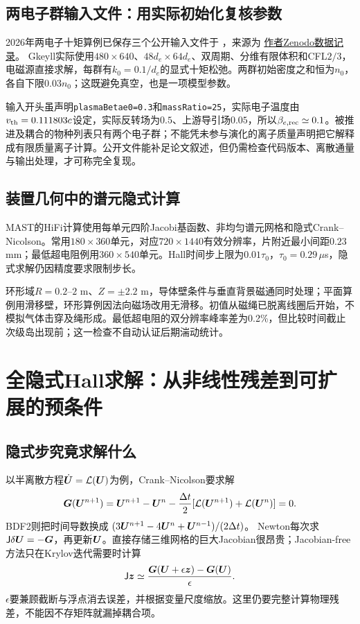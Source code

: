 \subsection{两电子群输入文件：用实际初始化复核参数}
2026年两电子十矩算例已保存三个公开输入文件于
，来源为
\href{https://doi.org/10.5281/zenodo.21114117}{作者Zenodo数据记录}。
Gkeyll实际使用$480\times640$、$48d_e\times64d_e$、双周期、分维有限体积和CFL$2/3$，电磁源直接求解，每群有$k_0=0.1/d_e$的显式十矩松弛。两群初始密度之和恒为$n_0$，各自下限$0.03n_0$；这既避免真空，也是一项模型参数。

输入开头虽声明\texttt{plasmaBetae0=0.3}和\texttt{massRatio=25}，实际电子温度由$v_{\rm th}=0.111803c$设定，实际反转场为$0.5$、上游导引场$0.05$，所以$\beta_{e,\rm rec}\simeq0.1$。被推进及耦合的物种列表只有两个电子群；不能凭未参与演化的离子质量声明把它解释成有限质量离子计算。公开文件能补足论文叙述，但仍需检查代码版本、离散通量与输出处理，才可称完全复现。\citep{F635}

\subsection{装置几何中的谱元隐式计算}
MAST的HiFi计算使用每单元四阶Jacobi基函数、非均匀谱元网格和隐式Crank--Nicolson。常用$180\times360$单元，对应$720\times1440$有效分辨率，片附近最小间距$0.23$ mm；最低超电阻例用$360\times540$单元。Hall时间步上限为$0.01\tau_0$，$\tau_0=0.29\,\mu$s，隐式求解仍因精度要求限制步长。

环形域$R=0.2$--$2$ m、$Z=\pm2.2$ m，导体壁条件与垂直背景磁通同时处理；平面算例用滑移壁，环形算例因法向磁场改用无滑移。初值从磁绳已脱离线圈后开始，不模拟气体击穿及绳形成。最低超电阻的双分辨率峰率差为0.2\%，但比较时间截止次级岛出现前；这一检查不自动认证后期湍动统计。\citep{Stanier2013}

\section{全隐式Hall求解：从非线性残差到可扩展的预条件}
\subsection{隐式步究竟求解什么}
以半离散方程$\dot{\bm{U}}=\mathcal L(\bm{U})$为例，Crank--Nicolson要求解
\begin{equation}
 \bm{G}(\bm{U}^{n+1})=\bm{U}^{n+1}-\bm{U}^n
 -\frac{\Delta t}{2}[\mathcal L(\bm{U}^{n+1})+\mathcal L(\bm{U}^n)]=0.
\end{equation}
BDF2则把时间导数换成
$(3\bm{U}^{n+1}-4\bm{U}^n+\bm{U}^{n-1})/(2\Delta t)$。
Newton每次求$\mathsf J\delta\bm{U}=-\bm{G}$，再更新$\bm{U}$。直接存储三维网格的巨大Jacobian很昂贵；Jacobian-free方法只在Krylov迭代需要时计算
\begin{equation}
 \mathsf J\bm{z}\simeq
 \frac{\bm{G}(\bm{U}+\epsilon\bm{z})-\bm{G}(\bm{U})}{\epsilon}.
\end{equation}
$\epsilon$要兼顾截断与浮点消去误差，并根据变量尺度缩放。这里仍要完整计算物理残差，不能因不存矩阵就漏掉耦合项。\citep{L296}

